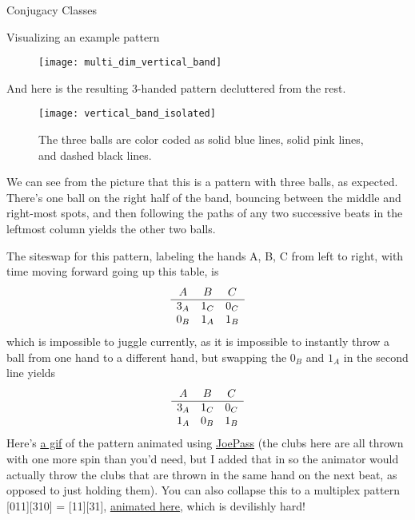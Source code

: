 \documentclass[12nt]{article}
\theoremstyle{plain}
\begin{document}
\begin{subsection}{Conjugacy Classes}
\begin{subsection}{Visualizing an example pattern}
\begin{figure}[h]
\texttt{[image: multi\_dim\_vertical\_band]}
\end{figure}

\clearpage
And here is the resulting 3-handed pattern decluttered from the rest.

\begin{figure}[h]
\texttt{[image: vertical\_band\_isolated]}
\caption{The three balls are color coded as solid blue lines, solid pink lines, and dashed black lines.}
\end{figure}

We can see from the picture that this is a pattern with three balls, as expected. There's one ball on the right half of the band, bouncing between the middle and right-most spots, and then following the paths of any two successive beats in the leftmost column yields the other two balls. 

The siteswap for this pattern, labeling the hands A, B, C from left to right, with time moving forward going up this table, is 
\[
\begin{array}{c c c}
A & B & C \\
\hline 3_A & 1_C & 0_C \\
0_B & 1_A & 1_B 
\end{array}
\]
which is impossible to juggle currently, as it is impossible to instantly throw a ball from one hand to a different hand, but swapping the $0_B$ and $1_A$ in the second line yields
\[
\begin{array}{c c c}
A & B & C \\
\hline 3_A & 1_C & 0_C \\
1_A & 0_B & 1_B 
\end{array}
\]
Here's \underline{\textcolor{blue}{\href{https://media.giphy.com/media/CU0Xn1m2CXLPVP5l1w/giphy.gif}{a gif}}} of the pattern animated using \underline{\textcolor{blue}{\href{http://westerboer.net/w/?page_id=151}{JoePass}}} (the clubs here are all thrown with one more spin than you'd need, but I added that in so the animator would actually throw the clubs that are thrown in the same hand on the next beat, as opposed to just holding them). You can also collapse this to a multiplex pattern [011][310] = [11][31], \underline{\textcolor{blue}{\href{https://jugglingedge.com/help/siteswapanimator.php?Pattern=\%5B31\%5D\%5B11\%5D}{animated here}}}, which is devilishly hard!

\end{subsection}


\end{subsection}
\end{document}

